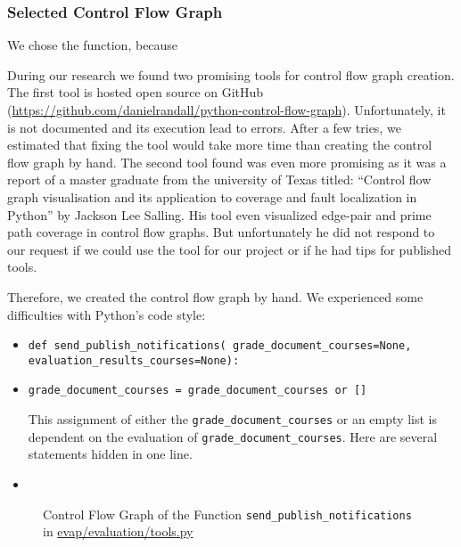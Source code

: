 \usetikzlibrary{arrows,automata}

\subsubsection{Selected Control Flow Graph}
We chose the function, because %

During our research we found two promising tools for control flow graph creation. 
The first tool is hosted open source on GitHub (\url{https://github.com/danielrandall/python-control-flow-graph}). 
Unfortunately, it is not documented and its execution lead to errors. 
After a few tries, we estimated that fixing the tool would take more time than creating the control flow graph by hand.
The second tool found was even more promising as it was a report of a master graduate from the university of Texas titled: 
``Control flow graph visualisation and its application to coverage and fault localization in Python''
by Jackson Lee Salling.
His tool even visualized edge-pair and prime path coverage in control flow graphs.
But unfortunately he did not respond to our request if we could use the tool for our project or if he had tips for published tools.


Therefore, we created the control flow graph by hand. We experienced some difficulties with Python's code style:
\begin{itemize}
    \item \texttt{def send\_publish\_notifications(
        grade\_document\_courses=None, 
        evaluation\_results\_courses=None):}
    
    
    \item \texttt{grade\_document\_courses = grade\_document\_courses or []}
    
    This assignment of either the \texttt{grade\_document\_courses} or an empty list is dependent on the evaluation of \texttt{grade\_document\_courses}. Here are several statements hidden in one line.
    \item 
\end{itemize}



\begin{figure}[h!]
\caption{Control Flow Graph of the Function \texttt{send\_publish\_notifications} in \url{evap/evaluation/tools.py}}
\end{figure}
